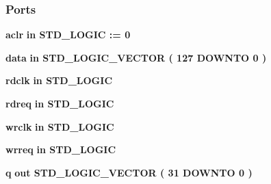 \subsubsection*{Ports}
 \begin{DoxyCompactItemize}
\item 
{\bf aclr}  {\bfseries {\bfseries \textcolor{keywordflow}{in}\textcolor{vhdlchar}{ }}} {\bfseries \textcolor{comment}{S\+T\+D\+\_\+\+L\+O\+G\+IC}\textcolor{vhdlchar}{ }\textcolor{vhdlchar}{ }\textcolor{vhdlchar}{\+:}\textcolor{vhdlchar}{=}\textcolor{vhdlchar}{ }\textcolor{vhdlchar}{ }\textcolor{vhdlchar}{\textquotesingle{}}\textcolor{vhdlchar}{ } \textcolor{vhdldigit}{0} \textcolor{vhdlchar}{ }\textcolor{vhdlchar}{\textquotesingle{}}\textcolor{vhdlchar}{ }} 
\item 
{\bf data}  {\bfseries {\bfseries \textcolor{keywordflow}{in}\textcolor{vhdlchar}{ }}} {\bfseries \textcolor{comment}{S\+T\+D\+\_\+\+L\+O\+G\+I\+C\+\_\+\+V\+E\+C\+T\+OR}\textcolor{vhdlchar}{ }\textcolor{vhdlchar}{(}\textcolor{vhdlchar}{ }\textcolor{vhdlchar}{ } \textcolor{vhdldigit}{127} \textcolor{vhdlchar}{ }\textcolor{keywordflow}{D\+O\+W\+N\+TO}\textcolor{vhdlchar}{ }\textcolor{vhdlchar}{ } \textcolor{vhdldigit}{0} \textcolor{vhdlchar}{ }\textcolor{vhdlchar}{)}\textcolor{vhdlchar}{ }} 
\item 
{\bf rdclk}  {\bfseries {\bfseries \textcolor{keywordflow}{in}\textcolor{vhdlchar}{ }}} {\bfseries \textcolor{comment}{S\+T\+D\+\_\+\+L\+O\+G\+IC}\textcolor{vhdlchar}{ }} 
\item 
{\bf rdreq}  {\bfseries {\bfseries \textcolor{keywordflow}{in}\textcolor{vhdlchar}{ }}} {\bfseries \textcolor{comment}{S\+T\+D\+\_\+\+L\+O\+G\+IC}\textcolor{vhdlchar}{ }} 
\item 
{\bf wrclk}  {\bfseries {\bfseries \textcolor{keywordflow}{in}\textcolor{vhdlchar}{ }}} {\bfseries \textcolor{comment}{S\+T\+D\+\_\+\+L\+O\+G\+IC}\textcolor{vhdlchar}{ }} 
\item 
{\bf wrreq}  {\bfseries {\bfseries \textcolor{keywordflow}{in}\textcolor{vhdlchar}{ }}} {\bfseries \textcolor{comment}{S\+T\+D\+\_\+\+L\+O\+G\+IC}\textcolor{vhdlchar}{ }} 
\item 
{\bf q}  {\bfseries {\bfseries \textcolor{keywordflow}{out}\textcolor{vhdlchar}{ }}} {\bfseries \textcolor{comment}{S\+T\+D\+\_\+\+L\+O\+G\+I\+C\+\_\+\+V\+E\+C\+T\+OR}\textcolor{vhdlchar}{ }\textcolor{vhdlchar}{(}\textcolor{vhdlchar}{ }\textcolor{vhdlchar}{ } \textcolor{vhdldigit}{31} \textcolor{vhdlchar}{ }\textcolor{keywordflow}{D\+O\+W\+N\+TO}\textcolor{vhdlchar}{ }\textcolor{vhdlchar}{ } \textcolor{vhdldigit}{0} \textcolor{vhdlchar}{ }\textcolor{vhdlchar}{)}\textcolor{vhdlchar}{ }} 

\end{DoxyCompactItemize}
